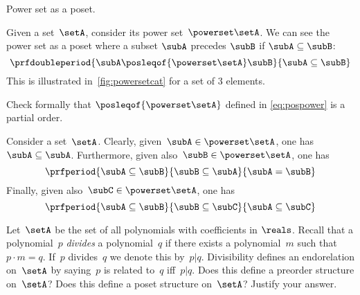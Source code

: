 \begin{marginfigure}
	\centering
	\caption{Power set as a poset.}
	\label{fig:powersetcat}
\end{marginfigure}

\begin{definition}
	\label{ex:hasseinclusion}
	Given a set~$\setA$, consider its power set~$\powerset\setA$.
	We can see the power set as a poset where a subset $\subA$ precedes $\subB$ if $\subA \subseteq \subB$:
	\begin{equation}\label{eq:pospower}
		\prfdoubleperiod{
			\subA \posleqof{\powerset\setA} \subB
		}{
			\subA \subseteq \subB
		}
	\end{equation}
	This is illustrated in~\cref{fig:powersetcat} for a set of 3 elements.
\end{definition}
\begin{exercise}
	Check formally that $\posleqof{\powerset\setA}$ defined in \cref{eq:pospower} is a partial order.
\end{exercise}
\begin{solution}
	Consider a set~$\setA$.
	Clearly, given~$\subA\in \powerset \setA$, one has~$\subA\subseteq \subA$.
	Furthermore, given also~$\subB\in \powerset \setA$, one has
	\begin{equation*}
		\prfperiod{\subA\subseteq \subB}{\subB\subseteq \subA}{\subA=\subB}
	\end{equation*}
	Finally, given also~$\subC\in \powerset \setA$, one has
	\begin{equation*}
		\prfperiod{\subA\subseteq \subB}{\subB\subseteq \subC}{\subA\subseteq\subC}
	\end{equation*}
\end{solution}

\vfill
%

\begin{gradedexercise}
	\label{ex:PolynomialDivisibility}
	Let~$\setA$ be the set of all polynomials with coefficients in $\reals$.
	Recall that a polynomial~$p$ \emph{divides} a polynomial~$q$ if there exists a polynomial~$m$ such that~$p \cdot m = q$.
	If~$p$ divides~$q$ we denote this by~$p \vert q$.
	Divisibility defines an endorelation on~$\setA$ by saying~$p$ is related to~$q$ iff~$p \vert q$.
	Does this define a preorder structure on~$\setA$?
	Does this define a poset structure on~$\setA$?
	Justify your answer.
\end{gradedexercise}

